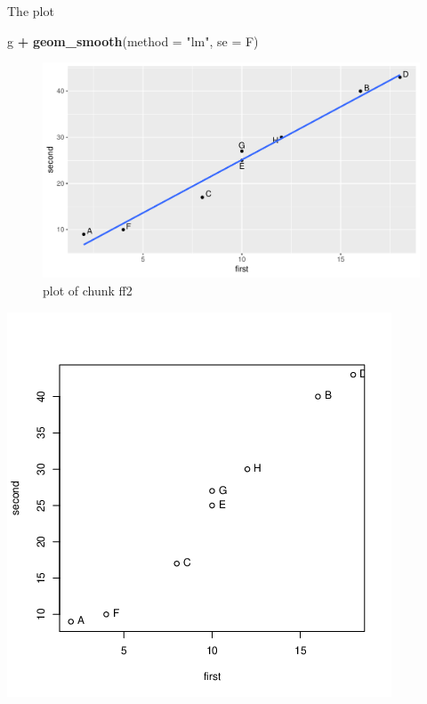 \documentclass[ignorenonframetext,]{beamer}
\newenvironment{Shaded}{\begin{snugshade}}{\end{snugshade}}
\newcommand{\DataTypeTok}[1]{\textcolor[rgb]{0.13,0.29,0.53}{#1}}
\newcommand{\KeywordTok}[1]{\textcolor[rgb]{0.13,0.29,0.53}{\textbf{#1}}}
\newcommand{\NormalTok}[1]{#1}
\newcommand{\OperatorTok}[1]{\textcolor[rgb]{0.81,0.36,0.00}{\textbf{#1}}}
\newcommand{\StringTok}[1]{\textcolor[rgb]{0.31,0.60,0.02}{#1}}
\begin{document}
\begin{frame}[fragile]{The plot}
\protect\hypertarget{the-plot-9}{}

\begin{Shaded}
\begin{Highlighting}[]
\NormalTok{g }\OperatorTok{+}\StringTok{ }\KeywordTok{geom_smooth}\NormalTok{(}\DataTypeTok{method =} \StringTok{"lm"}\NormalTok{, }\DataTypeTok{se =}\NormalTok{ F)}
\end{Highlighting}
\end{Shaded}

\begin{figure}
\centering
\includegraphics{figure/ff2-1.pdf}
\caption{plot of chunk ff2}
\end{figure}

\includegraphics{bPrincomp-testt.png}

\end{frame}
\end{document}
